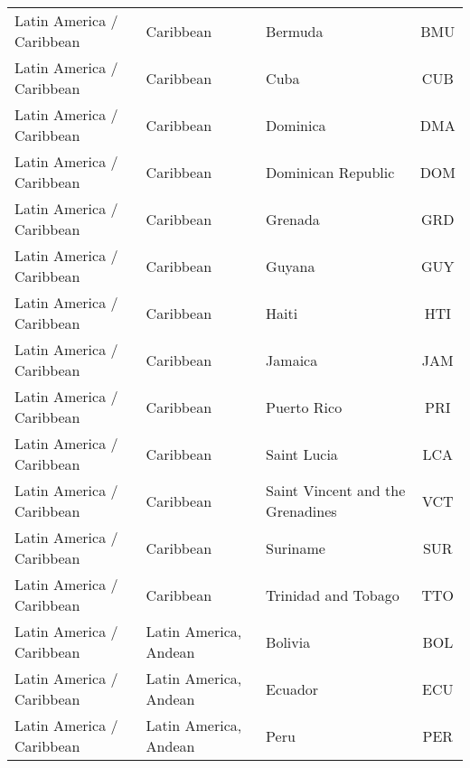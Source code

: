 \begin{longtable}{|p{3cm}|p{3.5cm}|p{5cm}|c|}
     Latin America / Caribbean &                    Caribbean &                                           Bermuda &  BMU \\
     Latin America / Caribbean &                    Caribbean &                                              Cuba &  CUB \\
     Latin America / Caribbean &                    Caribbean &                                          Dominica &  DMA \\
     Latin America / Caribbean &                    Caribbean &                                Dominican Republic &  DOM \\
     Latin America / Caribbean &                    Caribbean &                                           Grenada &  GRD \\
     Latin America / Caribbean &                    Caribbean &                                            Guyana &  GUY \\
     Latin America / Caribbean &                    Caribbean &                                             Haiti &  HTI \\
     Latin America / Caribbean &                    Caribbean &                                           Jamaica &  JAM \\
     Latin America / Caribbean &                    Caribbean &                                       Puerto Rico &  PRI \\
     Latin America / Caribbean &                    Caribbean &                                       Saint Lucia &  LCA \\
     Latin America / Caribbean &                    Caribbean &                  Saint Vincent and the Grenadines &  VCT \\
     Latin America / Caribbean &                    Caribbean &                                          Suriname &  SUR \\
     Latin America / Caribbean &                    Caribbean &                               Trinidad and Tobago &  TTO \\
     Latin America / Caribbean &        Latin America, Andean &                                           Bolivia &  BOL \\
     Latin America / Caribbean &        Latin America, Andean &                                           Ecuador &  ECU \\
     Latin America / Caribbean &        Latin America, Andean &                                              Peru &  PER \\

\end{longtable}
